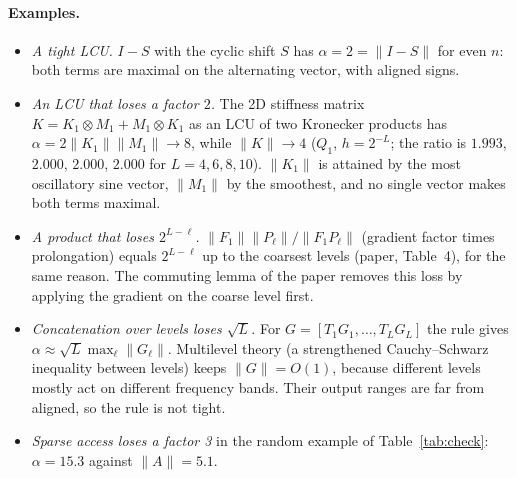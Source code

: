 \documentclass[11pt,a4paper]{article}
\begin{document}
\paragraph{Examples.}
\begin{itemize}
\item \emph{A tight LCU.} $I-S$ with the cyclic shift $S$ has $\alpha=2=\|I-S\|$
  for even $n$: both terms are maximal on the alternating vector, with
  aligned signs.
\item \emph{An LCU that loses a factor $2$.} The 2D stiffness matrix
  $K=K_1\otimes M_1+M_1\otimes K_1$ as an LCU of two Kronecker products has
  $\alpha=2\|K_1\|\|M_1\|\to8$, while $\|K\|\to4$ ($Q_1$, $h=2^{-L}$; the ratio is
  $1.993$, $2.000$, $2.000$, $2.000$ for $L=4,6,8,10$). $\|K_1\|$ is attained by the
  most oscillatory sine vector, $\|M_1\|$ by the smoothest, and no single
  vector makes both terms maximal.
\item \emph{A product that loses $2^{L-\ell}$.} $\|F_1\|\|P_\ell\|/\|F_1P_\ell\|$ (gradient factor
  times prolongation) equals $2^{L-\ell}$ up to the coarsest levels (paper,
  Table~4), for the same reason. The commuting lemma of the paper removes
  this loss by applying the gradient on the coarse level first.
\item \emph{Concatenation over levels loses $\sqrt L$.} For
  $G=[T_1G_1,\dots,T_LG_L]$ the rule gives $\alpha\approx\sqrt L\max_\ell\|G_\ell\|$. Multilevel
  theory (a strengthened Cauchy--Schwarz inequality between levels) keeps
  $\|G\|=O(1)$, because different levels mostly act on different frequency
  bands. Their output ranges are far from aligned, so the rule is not tight.
\item \emph{Sparse access loses a factor 3} in the random example of
  Table~\ref{tab:check}: $\alpha=15.3$ against $\|A\|=5.1$.
\end{itemize}
\end{document}
